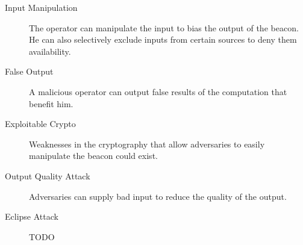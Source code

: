 \begin{description}
    \item [Input Manipulation] The operator can manipulate the input to bias the output of the beacon. He can also selectively exclude inputs from certain sources to deny them availability.
    \item [False Output] A malicious operator can output false results of the computation that benefit him.
    \item [Exploitable Crypto] Weaknesses in the cryptography that allow adversaries to easily manipulate the beacon could exist.
    \item [Output Quality Attack] Adversaries can supply bad input to reduce the quality of the output.
    \item [Eclipse Attack] TODO


\end{description}


